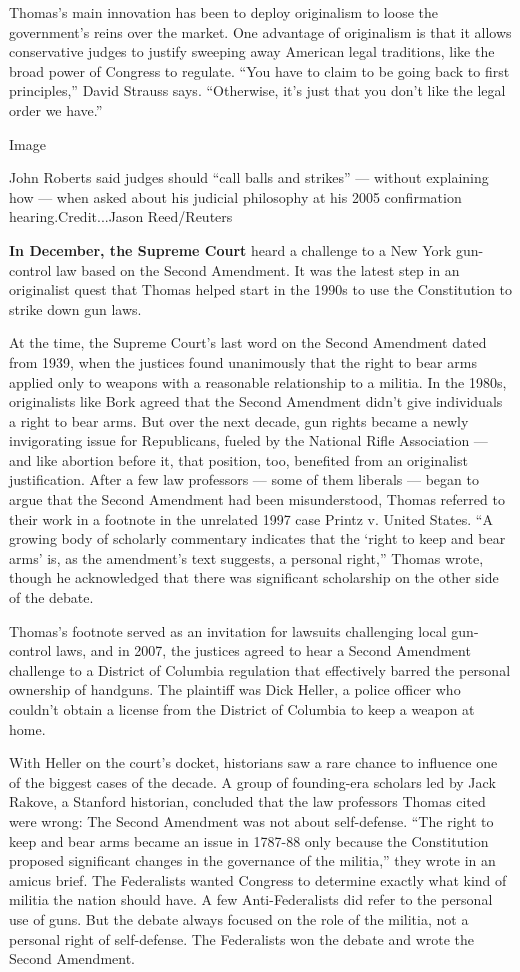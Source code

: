 Thomas's main innovation has been to deploy originalism to loose the
government's reins over the market. One advantage of originalism is that
it allows conservative judges to justify sweeping away American legal
traditions, like the broad power of Congress to regulate. ``You have to
claim to be going back to first principles,'' David Strauss says.
``Otherwise, it's just that you don't like the legal order we have.''

Image

John Roberts said judges should ``call balls and strikes'' --- without
explaining how --- when asked about his judicial philosophy at his 2005
confirmation hearing.Credit...Jason Reed/Reuters

\textbf{In December, the Supreme Court} heard a challenge to a New York
gun-control law based on the Second Amendment. It was the latest step in
an originalist quest that Thomas helped start in the 1990s to use the
Constitution to strike down gun laws.

At the time, the Supreme Court's last word on the Second Amendment dated
from 1939, when the justices found unanimously that the right to bear
arms applied only to weapons with a reasonable relationship to a
militia. In the 1980s, originalists like Bork agreed that the Second
Amendment didn't give individuals a right to bear arms. But over the
next decade, gun rights became a newly invigorating issue for
Republicans, fueled by the National Rifle Association --- and like
abortion before it, that position, too, benefited from an originalist
justification. After a few law professors --- some of them liberals ---
began to argue that the Second Amendment had been misunderstood, Thomas
referred to their work in a footnote in the unrelated 1997 case Printz
v. United States. ``A growing body of scholarly commentary indicates
that the `right to keep and bear arms' is, as the amendment's text
suggests, a personal right,'' Thomas wrote, though he acknowledged that
there was significant scholarship on the other side of the debate.

Thomas's footnote served as an invitation for lawsuits challenging local
gun-control laws, and in 2007, the justices agreed to hear a Second
Amendment challenge to a District of Columbia regulation that
effectively barred the personal ownership of handguns. The plaintiff was
Dick Heller, a police officer who couldn't obtain a license from the
District of Columbia to keep a weapon at home.

With Heller on the court's docket, historians saw a rare chance to
influence one of the biggest cases of the decade. A group of
founding-era scholars led by Jack Rakove, a Stanford historian,
concluded that the law professors Thomas cited were wrong: The Second
Amendment was not about self-defense. ``The right to keep and bear arms
became an issue in 1787-88 only because the Constitution proposed
significant changes in the governance of the militia,'' they wrote in an
amicus brief. The Federalists wanted Congress to determine exactly what
kind of militia the nation should have. A few Anti-Federalists did refer
to the personal use of guns. But the debate always focused on the role
of the militia, not a personal right of self-defense. The Federalists
won the debate and wrote the Second Amendment.

